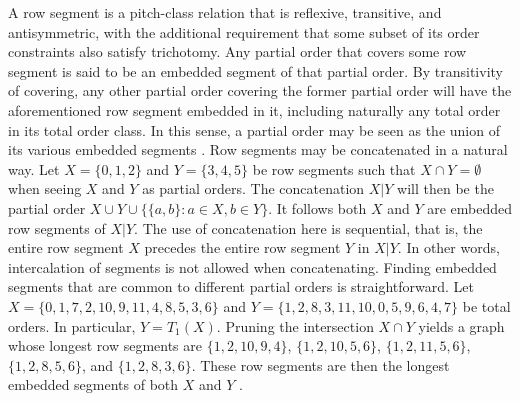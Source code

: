 A row segment is a pitch-class relation that is reflexive, transitive, and antisymmetric, with the additional requirement that some subset of its order constraints also satisfy trichotomy. Any partial order that covers some row segment is said to be an embedded segment of that partial order. By transitivity of covering, any other partial order covering the former partial order will have the aforementioned row segment embedded in it, including naturally any total order in its total order class. In this sense, a partial order may be seen as the union of its various embedded segments \cite[198]{Starr1984}. Row segments may be concatenated in a natural way. Let $X = \{ 0, 1, 2 \}$ and $Y = \{ 3, 4, 5 \}$ be row segments such that $X \cap Y = \emptyset$ when seeing $X$ and $Y$ as partial orders. The concatenation $X | Y$ will then be the partial order $X \cup Y \cup \{ \{ a, b \} : a \in X, b \in Y \}$. It follows both $X$ and $Y$ are embedded row segments of $X | Y$. The use of concatenation here is sequential, that is, the entire row segment $X$ precedes the entire row segment $Y$ in $X | Y$. In other words, intercalation of segments is not allowed when concatenating. Finding embedded segments that are common to different partial orders is straightforward. Let $X = \{ 0, 1, 7, 2, 10, 9, 11, 4, 8, 5, 3, 6 \}$ and $Y = \{ 1, 2, 8, 3, 11, 10, 0, 5, 9, 6, 4, 7 \}$ be total orders. In particular, $Y = T_1(X)$. Pruning the intersection $X \cap Y$ yields a graph whose longest row segments are $\{ 1, 2, 10, 9, 4 \}$, $\{ 1, 2, 10, 5, 6 \}$, $\{ 1, 2, 11, 5, 6 \}$, $\{ 1, 2, 8, 5, 6 \}$, and $\{ 1, 2, 8, 3, 6 \}$. These row segments are then the longest embedded segments of both $X$ and $Y$ \cite[200]{Starr1984}.

